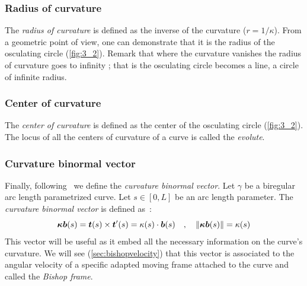 \subsubsection{Radius of curvature}
The \emph{radius of curvature} is defined as the inverse of the curvature ($r= 1/\kappa$). From a geometric point of view, one can demonstrate that it is the radius of the osculating circle (\cref{fig:3_2}). Remark that where the curvature vanishes the radius of curvature goes to infinity ; that is the osculating circle becomes a line, a circle of infinite radius.

\subsubsection{Center of curvature}
The \emph{center of curvature} is defined as the center of the osculating circle (\cref{fig:3_2}). The locus of all the centers of curvature of a curve is called the \emph{evolute}.

\subsubsection{Curvature binormal vector}
\label{sec:kb}
Finally, following~\cite{Bergou2008} we define the \emph{curvature binormal vector}. Let $\gamma$ be a biregular arc length parametrized curve. Let $s\in [0,L]$ be an arc length parameter. The \emph{curvature binormal vector} is defined as~:
\begin{equation}
	\boldsymbol{\kappa b}(s) = \boldsymbol{t}(s) \times \boldsymbol{t}'(s) = \kappa(s)\cdot\boldsymbol{b}(s)
	\quad,\quad
	\lVert\boldsymbol{\kappa b}(s)\rVert= \kappa(s)
\label{eq:kb}
\end{equation}
This vector will be useful as it embed all the necessary information on the curve's curvature. We will see (\cref{sec:bishopvelocity}) that this vector is associated to the angular velocity of a specific adapted moving frame attached to the curve and called the \emph{Bishop frame}.

